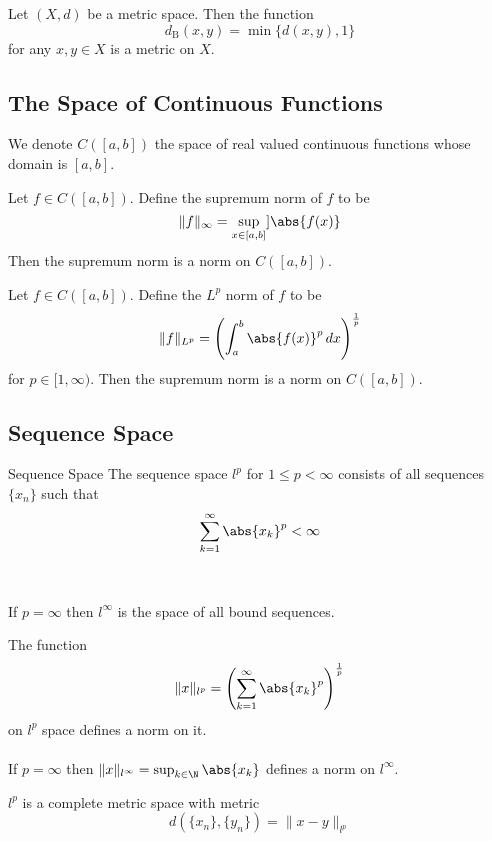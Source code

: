 \documentclass[a4paper]{article}
\begin{document}
\begin{prp}{}{} Let $(X,d)$ be a metric space. Then the function $$d_\text{B}(x,y)=\min\{d(x,y),1\}$$ for any $x,y\in X$ is a metric on $X$. 
\end{prp}

\subsection{The Space of Continuous Functions}
\begin{defn}{}{} We denote $C([a,b])$ the space of real valued continuous functions whose domain is $[a,b]$. 
\end{defn}

\begin{prp}{}{} Let $f\in C([a,b])$. Define the supremum norm of $f$ to be $$\|f\|_\infty=\sup_{x\in[a,b]}]\abs{f(x)}$$ Then the supremum norm is a norm on $C([a,b])$. 
\end{prp}

\begin{prp}{}{} Let $f\in C([a,b])$. Define the $L^p$ norm of $f$ to be $$\|f\|_{L^p}=\left(\int_a^b\abs{f(x)}^p\,dx\right)^{\frac{1}{p}}$$ for $p\in[1,\infty)$. Then the supremum norm is a norm on $C([a,b])$. 
\end{prp}

\subsection{Sequence Space}
\begin{defn}{Sequence Space}{} The sequence space $l^p$ for $1\leq p<\infty$ consists of all sequences $\{x_n\}$ such that $$\sum_{k=1}^\infty\abs{x_k}^p<\infty$$ \\~\\
If $p=\infty$ then $l^\infty$ is the space of all bound sequences. 
\end{defn}

\begin{prp}{}{} The function $$\|x\|_{l^p}=\left(\sum_{k=1}^\infty\abs{x_k}^p\right)^{\frac{1}{p}}$$ on $l^p$ space defines a norm on it. \\~\\ If $p=\infty$ then $\|x\|_{l^\infty}=\sup_{k\in\N}\abs{x_k}$ defines a norm on $l^\infty$. 
\end{prp}

\begin{prp}{}{} $l^p$ is a complete metric space with metric $$d(\{x_n\},\{y_n\})=\|x-y\|_{l^p}$$
\end{prp}
\end{document}
